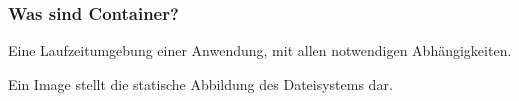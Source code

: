 \begin{frame}
	\frametitle{Was sind Container?}
	\begin{definition}[Container]
		Eine Laufzeitumgebung einer Anwendung, mit allen notwendigen Abhängigkeiten.\\ 
	\end{definition}
	
	\begin{definition}[Image]
		Ein Image stellt die statische Abbildung des Dateisystems dar.
	\end{definition}
\end{frame}